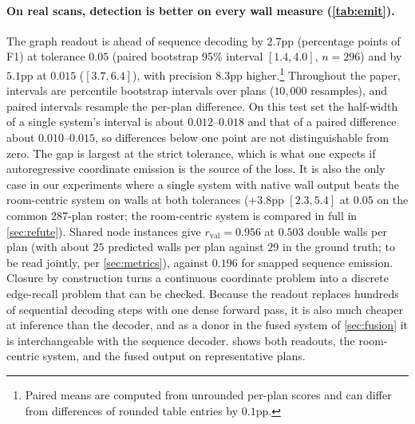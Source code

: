\documentclass{article}
\begin{document}
\paragraph{On real scans, detection is better on every wall measure
(\cref{tab:emit}).} The graph readout is ahead of sequence decoding by $2.7$pp (percentage points of F1)
at tolerance $0.05$ (paired bootstrap 95\% interval $[1.4,4.0]$, $n=296$) and
by $5.1$pp at $0.015$ ($[3.7,6.4]$), with precision $8.3$pp
higher.\footnote{Paired means are computed from unrounded per-plan scores and
can differ from differences of rounded table entries by $0.1$pp.} Throughout
the paper, intervals are percentile bootstrap intervals over plans
($10{,}000$ resamples), and paired intervals resample the per-plan difference.
On this test set the half-width of a single system's interval is about
$0.012$--$0.018$ and that of a paired difference about $0.010$--$0.015$, so
differences below one point are not distinguishable from zero.
The gap is largest at the strict tolerance, which is what one expects if
autoregressive coordinate emission is the source of the loss. It is also the only
case in our experiments where a single system with native wall output beats
the room-centric system on walls at both tolerances ($+3.8$pp $[2.3,5.4]$ at
$0.05$ on the common 287-plan roster; the room-centric system is compared in
full in \cref{sec:refute}). Shared node instances give
$r_{\mathrm{val}}=0.956$ at $0.503$ double walls per plan (with about $25$ predicted walls per plan against $29$ in the ground
truth; to be read jointly,
per \cref{sec:metrics}), against $0.196$ for
snapped sequence emission. Closure by construction turns a continuous
coordinate problem into a discrete edge-recall problem that can be checked.
Because the readout replaces hundreds of sequential decoding steps with one
dense forward pass, it is also much cheaper at inference than the decoder, and as a
donor in the fused system of \cref{sec:fusion} it is interchangeable with the
sequence decoder.  shows both readouts, the room-centric
system, and the fused output on representative plans.
\end{document}
